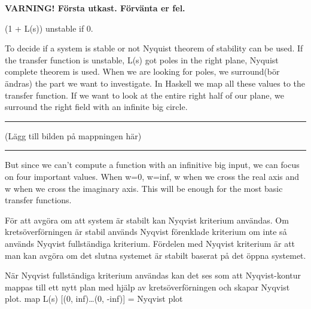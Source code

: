 \textbf{VARNING! Första utkast. Förvänta er fel.}

(1 + L(s)) unstable if 0.

To decide if a system is stable or not Nyquist theorem of stability can be used. If the transfer function is unstable, L(s) got poles in the right plane, Nyquist complete theorem is used. When we are looking for poles, we surround(bör ändras) the part we want to investigate. In Haskell we map all these values to the transfer function. If we want to look at the entire right half of our plane, we surround the right field with an infinite big circle.
\hrule
(Lägg till bilden på mappningen här)
\hrule
But since we can’t compute a function with an infinitive big input, we can focus on four important values. When w=0, w=inf, w when we cross the real axis and w when we cross the imaginary axis. This will be enough for the most basic transfer functions.

För att avgöra om att system är stabilt kan Nyqvist kriterium användas. Om kretsöverförningen är stabil används Nyqvist förenklade kriterium om inte så används Nyqvist fullständiga kriterium. Fördelen med Nyqvist kriterium är att man kan avgöra om det slutna systemet är stabilt baserat på det öppna systemet.

När Nyqvist fullständiga kriterium användas kan det ses som att Nyqvist-kontur mappas till ett nytt plan med hjälp av kretsöverförningen och skapar Nyqvist plot.
map L(s) [(0, inf)…(0, -inf)] = Nyqvist plot
